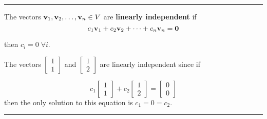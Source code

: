 	 
	
 	
 \rule[0.01in]{\textwidth}{0.0025in}







\begin{tcolorbox}[colback=yellow!10!,colframe=gray!15!]
	\begin{definition}
		The vectors ${\bf v}_1, {\bf v}_2,  \dots, {\bf v}_n \in V$ are \textbf{linearly independent} if 
\[  c_1 {\bf v}_1 + c_2 {\bf v}_2 + \cdots + c_n {\bf v}_n = {\bf 0} \]

then $c_i = 0 \; \forall i$.


	\end{definition}
	 
\end{tcolorbox}



















\begin{example}
The vectors $\begin{bmatrix} 1 \\1\end{bmatrix}$ and  $\begin{bmatrix} 1 \\2 \end{bmatrix}$ are linearly independent since if 

\[  c_1  \begin{bmatrix} 1 \\1\end{bmatrix} + c_2  \begin{bmatrix} 1 \\2\end{bmatrix} =  \begin{bmatrix} 0 \\0 \end{bmatrix} \]
then the only solution to this equation is $c_1 = 0 = c_2$.  

 \end{example}
	
	 
\rule[0.01in]{\textwidth}{0.0025in}


